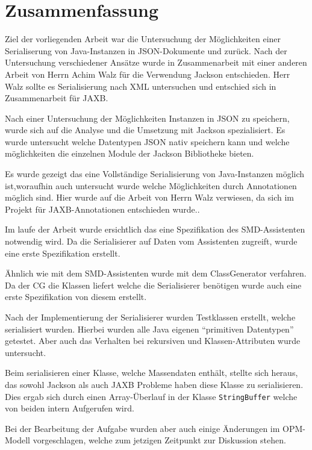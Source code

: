 \section{Zusammenfassung}
Ziel der vorliegenden Arbeit war die Untersuchung der M\"oglichkeiten einer Serialiserung von Java-Instanzen in JSON-Dokumente und zur\"uck. Nach der Untersuchung verschiedener Ans\"atze wurde in Zusammenarbeit mit einer anderen Arbeit von Herrn Achim Walz f\"ur die Verwendung Jackson entschieden. Herr Walz sollte es Serialisierung nach XML untersuchen und entschied sich in Zusammenarbeit f\"ur JAXB. \cite{Wal14}

Nach einer Untersuchung der M\"oglichkeiten Instanzen in JSON zu speichern, wurde sich auf die Analyse und die Umsetzung mit Jackson spezialisiert. Es wurde untersucht welche Datentypen JSON nativ speichern kann und welche m\"oglichkeiten die einzelnen Module der Jackson Bibliotheke bieten.

Es wurde gezeigt das eine Vollst\"andige Serialisierung von Java-Instanzen m\"oglich ist,woraufhin auch untersucht wurde welche M\"oglichkeiten durch Annotationen m\"oglich sind. Hier wurde auf die Arbeit von Herrn Walz verwiesen, da sich im Projekt f\"ur JAXB-Annotationen entschieden wurde..

Im laufe der Arbeit wurde ersichtlich das eine Spezifikation des \ac{SMD}-Assistenten notwendig wird. Da die Serialisierer auf Daten vom Assistenten zugreift, wurde eine erste Spezifikation erstellt.

\"Ahnlich wie mit dem \ac{SMD}-Assistenten wurde mit dem ClassGenerator verfahren. Da der \ac{CG} die Klassen liefert welche die Serialisierer ben\"otigen wurde auch eine erste Spezifikation von diesem erstellt.

Nach der Implementierung der Serialisierer wurden Testklassen erstellt, welche serialisiert wurden. Hierbei wurden alle Java eigenen "`primitiven Datentypen"' getestet. Aber auch das Verhalten bei rekursiven und Klassen-Attributen wurde untersucht.

Beim serialisieren einer Klasse, welche Massendaten enth\"alt, stellte sich heraus, das sowohl Jackson als auch JAXB Probleme haben diese Klasse zu serialisieren. Dies ergab sich durch einen Array-\"Uberlauf in der Klasse \texttt{StringBuffer} welche von beiden intern Aufgerufen wird.

Bei der Bearbeitung der Aufgabe wurden aber auch einige \"Anderungen im \ac{OPM}-Modell vorgeschlagen, welche zum jetzigen Zeitpunkt zur Diskussion stehen.

